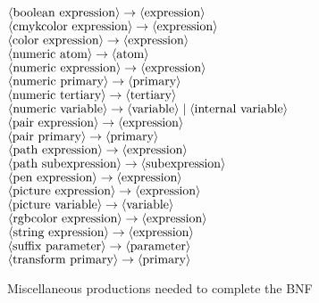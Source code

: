 \begin{figure}[htp]
\begin{ctabbing}
$\tt {\langle\hbox{boolean expression}\rangle} \rightarrow {\langle\hbox{expression}\rangle}$\\
$\tt {\langle\hbox{cmykcolor expression}\rangle} \rightarrow {\langle\hbox{expression}\rangle}$\\
$\tt {\langle\hbox{color expression}\rangle} \rightarrow {\langle\hbox{expression}\rangle}$\\
$\tt {\langle\hbox{numeric atom}\rangle} \rightarrow {\langle\hbox{atom}\rangle}$\\
$\tt {\langle\hbox{numeric expression}\rangle} \rightarrow {\langle\hbox{expression}\rangle}$\\
$\tt {\langle\hbox{numeric primary}\rangle} \rightarrow {\langle\hbox{primary}\rangle}$\\
$\tt {\langle\hbox{numeric tertiary}\rangle} \rightarrow {\langle\hbox{tertiary}\rangle}$\\
$\tt {\langle\hbox{numeric variable}\rangle} \rightarrow {\langle\hbox{variable}\rangle} \;|\; {\langle\hbox{internal variable}\rangle}$\\
$\tt {\langle\hbox{pair expression}\rangle} \rightarrow {\langle\hbox{expression}\rangle}$\\
$\tt {\langle\hbox{pair primary}\rangle} \rightarrow {\langle\hbox{primary}\rangle}$\\
$\tt {\langle\hbox{path expression}\rangle} \rightarrow {\langle\hbox{expression}\rangle}$\\
$\tt {\langle\hbox{path subexpression}\rangle} \rightarrow {\langle\hbox{subexpression}\rangle}$\\
$\tt {\langle\hbox{pen expression}\rangle} \rightarrow {\langle\hbox{expression}\rangle}$\\
$\tt {\langle\hbox{picture expression}\rangle} \rightarrow {\langle\hbox{expression}\rangle}$\\
$\tt {\langle\hbox{picture variable}\rangle} \rightarrow {\langle\hbox{variable}\rangle}$\\
$\tt {\langle\hbox{rgbcolor expression}\rangle} \rightarrow {\langle\hbox{expression}\rangle}$\\
$\tt {\langle\hbox{string expression}\rangle} \rightarrow {\langle\hbox{expression}\rangle}$\\
$\tt {\langle\hbox{suffix parameter}\rangle} \rightarrow {\langle\hbox{parameter}\rangle}$\\
$\tt {\langle\hbox{transform primary}\rangle} \rightarrow {\langle\hbox{primary}\rangle}$
\end{ctabbing}
\caption{Miscellaneous productions needed to complete the BNF}
\label{sytypexpr}
\end{figure}

